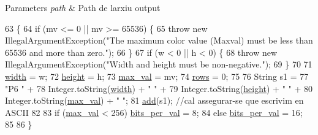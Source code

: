 \begin{DoxyParams}{Parameters}
{\em path} & Path de l\textquotesingle{}arxiu output \\
\hline
\end{DoxyParams}

\begin{DoxyCode}
63                                             \{
64         \textcolor{keywordflow}{if} (mv <= 0 || mv >= 65536) \{
65             \textcolor{keywordflow}{throw} \textcolor{keyword}{new} IllegalArgumentException(\textcolor{stringliteral}{"The maximum color value (Maxval) must be less than 65536
       and more than zero."});
66         \}
67         \textcolor{keywordflow}{if} (w < 0 || h < 0) \{
68             \textcolor{keywordflow}{throw} \textcolor{keyword}{new} IllegalArgumentException(\textcolor{stringliteral}{"Width and height must be non-negative."});
69         \}
70 
71         \hyperlink{classpersistencia_1_1output_1_1Ctrl__Output__Img_ae4a01ec459078cece4815d2fe7db8a64}{width} = w;
72         \hyperlink{classpersistencia_1_1output_1_1Ctrl__Output__Img_a1d7bc52c64c79e8545ae6d1ae8b9ee2e}{height} = h;
73         \hyperlink{classpersistencia_1_1output_1_1Ctrl__Output__Img_ab9e685dae026afe43188c62d7c4fad53}{max\_val} = mv;
74         \hyperlink{classpersistencia_1_1output_1_1Ctrl__Output__Img_a586ee8128a26b6786471e040a705bdbc}{rows} = 0;
75 
76         String s1 =
77             \textcolor{stringliteral}{"P6 "} +
78             Integer.toString(\hyperlink{classpersistencia_1_1output_1_1Ctrl__Output__Img_ae4a01ec459078cece4815d2fe7db8a64}{width}) + \textcolor{stringliteral}{" "} + 
79             Integer.toString(\hyperlink{classpersistencia_1_1output_1_1Ctrl__Output__Img_a1d7bc52c64c79e8545ae6d1ae8b9ee2e}{height}) + \textcolor{stringliteral}{" "} +
80             Integer.toString(\hyperlink{classpersistencia_1_1output_1_1Ctrl__Output__Img_ab9e685dae026afe43188c62d7c4fad53}{max\_val}) + \textcolor{stringliteral}{" "};
81         \hyperlink{classpersistencia_1_1output_1_1Ctrl__Output__Img_a305a977f4d4b999cf65e14e7106b6c5e}{add}(s1); \textcolor{comment}{//cal assegurar-se que escrivim en ASCII}
82 
83         \textcolor{keywordflow}{if} (\hyperlink{classpersistencia_1_1output_1_1Ctrl__Output__Img_ab9e685dae026afe43188c62d7c4fad53}{max\_val} < 256) \hyperlink{classpersistencia_1_1output_1_1Ctrl__Output__Img_ad40e63d16abd9058889249f5ad84f200}{bits\_per\_val} = 8;
84         \textcolor{keywordflow}{else}               \hyperlink{classpersistencia_1_1output_1_1Ctrl__Output__Img_ad40e63d16abd9058889249f5ad84f200}{bits\_per\_val} = 16;
85 
86     \}
\end{DoxyCode}


